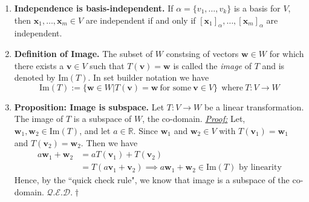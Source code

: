 \documentclass[oneside, 12pt]{book}
\newcommand{\settag}[1]{\renewcommand{\theenumi}{#1}}
\newcommand{\R}{\mathbb{R}}
\newcommand{\qed}{\hfill $\mathcal{Q}.\mathcal{E}.\mathcal{D}.\dagger$}
\newcommand{\tbf}[1]{\textbf{#1}}
\newcommand{\tit}[1]{\textit{#1}}
\newcommand{\proof}{\tit{\underline{Proof:}}} %
\newcommand{\para}[1]{\item \tbf{#1}}
\newcommand{\vv}{\mathbf{v}}
\newcommand{\vw}{\mathbf{w}}
\newcommand{\vx}{\mathbf{x}}
\newcommand{\bx}{\mathbf{x}}
\begin{document}
\begin{enumerate}
        \settag{2.3.8}
        \item \tbf{Independence is basis-independent.} If $\alpha = \{v_1,\ldots,v_k\}$ is a basis for $V$, then $\vx_1,\ldots,\vx_m\in V$ are independent if and only if $[\bx_1]_\alpha,\ldots,[\bx_m]_\alpha$ are independent.
        
        \settag{2.3.10}
        \para{Definition of Image.} The subset of $W$ constsing of vectors $\vw\in W$ for which there exists a $\vv\in V$ such that $T(\vv) = \vw$ is called the \tit{image} of $T$ and is denoted by Im$(T)$. In set builder notation we have
        \begin{equation*}
            \text{Im}(T) := \{\vw\in W|T(\vv) = \vw~\text{for some}~\vv \in V\}~~\text{where}~T:V\rightarrow{} W
        \end{equation*}
        
        \settag{2.3.11}
        \para{Proposition: Image is subspace.} Let $T:V\rightarrow{} W$ be a linear transformation. The image of $T$ is a subspace of $W$, the co-domain.\newline
        \proof\newline
        Let, $\vw_1,\vw_2\in\text{Im}(T)$, and let $a\in \R$. Since $\vw_1$ and $\vw_2\in V$ with $T(\vv_1) = \vw_1$ and $T(\vv_2) = \vw_2$. Then we have
        \begin{align*}
            a\vw_1 + \vw_2 
            &= aT(\vv_1) + T(\vv_2) \\
            &= T(a\vv_1 + \vv_2) 
            \implies a\vw_1 +\vw_2 \in \text{Im}(T)\text{ by linearity}
        \end{align*}
        Hence, by the ``quick check rule", we know that image is a subspace of the co-domain. \qed
        

\end{enumerate}
\end{document}
